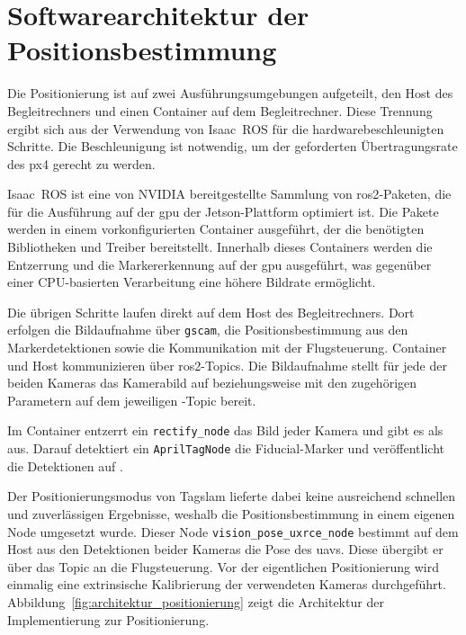 \section{Softwarearchitektur der Positionsbestimmung}
\label{sec:softwarearchitektur_positionierung}
Die Positionierung ist auf zwei Ausführungsumgebungen aufgeteilt, den Host des Begleitrechners und einen Container auf dem Begleitrechner.
Diese Trennung ergibt sich aus der Verwendung von Isaac~ROS für die hardwarebeschleunigten Schritte.
Die Beschleunigung ist notwendig, um der geforderten Übertragungsrate des \gls{px4} gerecht zu werden.

Isaac~ROS ist eine von NVIDIA bereitgestellte Sammlung von \gls{ros2}-Paketen, die für die Ausführung auf der \gls{gpu} der Jetson-Plattform optimiert ist.
Die Pakete werden in einem vorkonfigurierten Container ausgeführt, der die benötigten Bibliotheken und Treiber bereitstellt.
Innerhalb dieses Containers werden die Entzerrung und die Markererkennung auf der \gls{gpu} ausgeführt, was gegenüber 
einer CPU-basierten Verarbeitung eine höhere Bildrate ermöglicht.

Die übrigen Schritte laufen direkt auf dem Host des Begleitrechners.
Dort erfolgen die Bildaufnahme über \texttt{gscam}, die Positionsbestimmung aus den Markerdetektionen sowie die Kommunikation mit der Flugsteuerung.
Container und Host kommunizieren über \gls{ros2}-Topics.
Die Bildaufnahme stellt für jede der beiden Kameras das Kamerabild auf  beziehungsweise  
mit den zugehörigen Parametern auf dem jeweiligen -Topic bereit.

Im Container entzerrt ein \texttt{rectify\_node} das Bild jeder Kamera und gibt es als  aus.
Darauf detektiert ein \texttt{AprilTagNode} die Fiducial-Marker und veröffentlicht die Detektionen auf .

Der Positionierungsmodus von Tag\gls{slam} lieferte dabei keine ausreichend schnellen und zuverlässigen Ergebnisse, weshalb die Positionsbestimmung in einem eigenen Node umgesetzt wurde.
Dieser Node \texttt{vision\_pose\_uxrce\_node} bestimmt auf dem Host aus den Detektionen beider Kameras die Pose des \gls{uav}s.
Diese übergibt er über das Topic  an die Flugsteuerung.
Vor der eigentlichen Positionierung wird einmalig eine extrinsische Kalibrierung der verwendeten Kameras durchgeführt.
Abbildung~\ref{fig:architektur_positionierung} zeigt die Architektur der Implementierung zur Positionierung.


